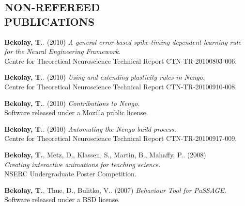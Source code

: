 \documentclass[line,margin]{res}
\begin{document}
\begin{resume}
\section{NON-REFEREED \\ PUBLICATIONS}
  \textbf{Bekolay, T.}. (2010)
    {\sl A general error-based spike-timing dependent learning rule for the Neural Engineering Framework.} \\
    Centre for Theoretical Neuroscience Technical Report CTN-TR-20100803-006.

  \textbf{Bekolay, T.}. (2010)
    {\sl Using and extending plasticity rules in Nengo.} \\
    Centre for Theoretical Neuroscience Technical Report CTN-TR-20100910-008.

  \textbf{Bekolay, T.}. (2010)
    {\sl Contributions to Nengo.} \\
    Software released under a Mozilla public license.

  \textbf{Bekolay, T.}. (2010)
    {\sl Automating the Nengo build process.} \\
    Centre for Theoretical Neuroscience Technical Report CTN-TR-20100917-009.

  \textbf{Bekolay, T.}, Metz, D., Klassen, S., Martin, B., Mahaffy, P.. (2008) \\
    {\sl Creating interactive animations for teaching science.} \\
    NSERC Undergraduate Poster Competition.

  \textbf{Bekolay, T.}, Thue, D., Bulitko, V.. (2007)
    {\sl Behaviour Tool for PaSSAGE.} \\
    Software released under a BSD license.

\end{resume}
\end{document}
